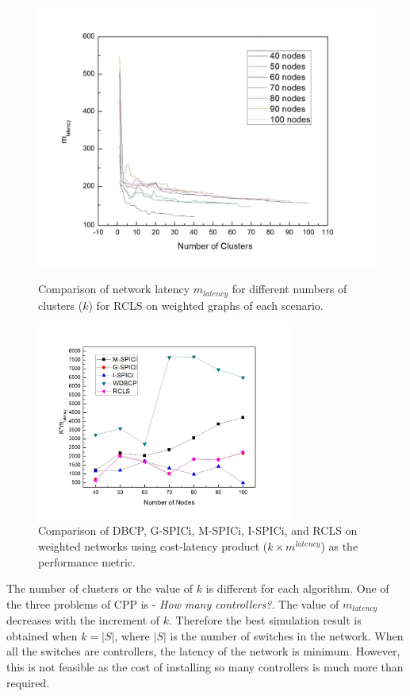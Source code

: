 \documentclass[times]{dacauth}
\begin{document}
\begin{figure}
	\centering
	\includegraphics[width=0.75\linewidth]{Figures/kanalysis.jpg}
	\caption{Comparison of network latency $m_{latency}$ for different numbers of clusters ($k$) for RCLS on weighted graphs of each scenario.}
	\label{fig:kanalysis}
	
	\centering 
	\includegraphics[width=0.75\textwidth]{Figures/wgraphmul.jpg}
	\caption{Comparison of DBCP, G-SPICi, M-SPICi, I-SPICi, and RCLS on weighted networks using cost-latency product ($k\times m^{latency}$) as the performance metric.}
	\label{fig:wgraphmul}
\end{figure}
The number of clusters or the value of $k$ is different for each algorithm. One of the three problems of CPP is - \emph{How many controllers?}. The value of $m_{latency}$ decreases with the increment of $k$. Therefore the best simulation result is obtained when $k=|S|$, where $|S|$ is the number of switches in the network. When all the switches are controllers, the latency of the network is minimum. However, this is not feasible as the cost of installing so many controllers is much more than required.
\end{document}
